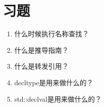 \section{习题}
\begin{enumerate}
  \item 什么时候执行名称查找？
  \item 什么是推导指南？
  \item 什么是转发引用？
  \item decltype是用来做什么的？
  \item std::declval是用来做什么的？
\end{enumerate}